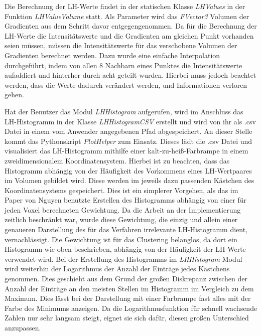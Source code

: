 Die Berechnung der LH-Werte findet in der statischen Klasse \textit{LHValues} in der Funktion \textit{LHValueVolume} statt. Als Parameter wird das \textit{FVector3} Volumen der Gradienten aus dem Schritt davor entgegengenommen. Da für die Berechnung der LH-Werte die Intensitätswerte und die Gradienten am gleichen Punkt vorhanden seien müssen, müssen die Intensitätswerte für das verschobene Volumen der Gradienten berechnet werden. Dazu wurde eine einfache Interpolation durchgeführt, indem von allen 8 Nachbarn eines Punktes die Intensitätswerte aufaddiert und hinterher durch acht geteilt wurden. Hierbei muss jedoch beachtet werden, dass die Werte dadurch verändert werden, und Informationen verloren gehen.


Hat der Benutzer das Modul \textit{LHHistogram} aufgerufen, wird im Anschluss das LH-Histogramm in der Klasse \textit{LHHistogramCSV} erstellt und wird von ihr als .csv Datei in einem vom Anwender angegebenen Pfad abgespeichert.
\newline
An dieser Stelle kommt das Pythonskript \textit{PlotHelper} zum Einsatz. Dieses lädt die .csv Datei und visualisiert das LH-Histogramm mithilfe einer kalt-zu-heiß-Farbrampe in einem zweidimensionalem Koordinatensystem.
\newline
Hierbei ist zu beachten, dass das Histogramm abhängig von der Häufigkeit des Vorkommens eines LH-Wertpaares im Volumen gebildet wird. Diese werden im jeweils dazu passenden Kästchen des Koordinatensystems gespeichert.
\newline
Dies ist ein simplerer Vorgehen, als das im Paper von Nguyen \cite{nguyen2012clustering} benutzte Erstellen des Histogramms abhängig von einer für jeden Voxel berechneten Gewichtung. Da die Arbeit an der Implementierung zeitlich beschränkt war, wurde diese Gewichtung, die einzig und allein einer genaueren Darstellung des für das Verfahren irrelevante LH-Histogramm dient, vernachlässigt. Die Gewichtung ist für das Clustering belanglos, da dort ein Histogramm wie oben beschrieben, abhängig von der Häufigkeit der LH-Werte verwendet wird.
\newline
Bei der Erstellung des Histogramms im \textit{LHHistogram} Modul wird weiterhin der Logarithmus der Anzahl der Einträge jedes Kästchens genommen. Dies geschieht aus dem Grund der großen Diskrepanz zwischen der Anzahl der Einträge an den meisten Stellen im Histogramm im Vergleich zu dem Maximum. Dies lässt bei der Darstellung mit einer Farbrampe fast alles mit der Farbe des Minimums anzeigen. Da die Logarithmusfunktion für schnell wachsende Zahlen nur sehr langsam steigt, eignet sie sich dafür, diesen großen Unterschied anzupassen.



